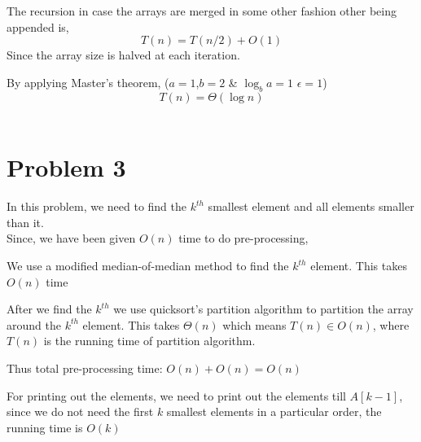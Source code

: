 \documentclass[12pt,letterpaper]{article}
\begin{document}
  The recursion in case the arrays are merged in some other fashion other being appended is,
  $$T(n) = T(n/2) + O(1)$$
  Since the array size is halved at each iteration.
  
  
  By applying Master's theorem, ($a=1$,$b=2$ & $\log_b a = 1$ $\epsilon = 1$) 
  $$T(n) = \Theta (\log n)$$\\
  
  
  
\section*{Problem 3}
  In this problem, we need to find the $k^{th}$ smallest element and all elements smaller than it.\\
  
  Since, we have been given $O(n)$ time to do pre-processing, 
  
  We use a modified median-of-median method to find the $k^{th}$ element. This takes $O(n)$ time 
  
  After we find the $k^{th}$ we use quicksort's partition algorithm to partition the array around the $k^{th}$ element. This takes $\Theta(n)$ which means $T(n) \in O(n)$, where $T(n)$ is the running time of partition algorithm.
  
  Thus total pre-processing time: $O(n)+O(n)=O(n)$
  
  For printing out the elements, we need to print out the elements till $A[k-1]$, since we do not need the first $k$ smallest elements in a particular order, the running time is $O(k)$
  
  
  
  
  
\end{document}
